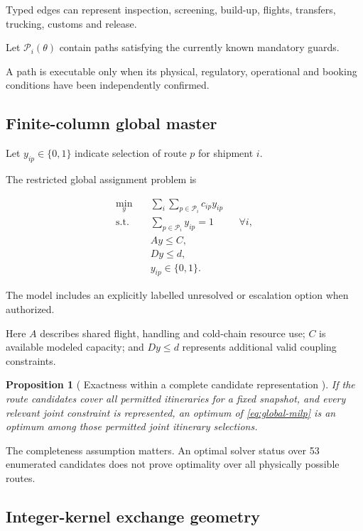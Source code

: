 \documentclass[10pt,a4paper]{article}
\theoremstyle{plain}
\newtheorem{proposition}[theorem]{Proposition}
\theoremstyle{definition}
\theoremstyle{remark}
\begin{document}
Typed edges can represent inspection,
screening, build-up, flights,
transfers, trucking, customs and release.

Let \(\mathcal P_i(\theta)\)
contain paths satisfying the
currently known mandatory guards.

A path is executable only when its
physical, regulatory,
operational and booking conditions
have been independently confirmed.

\subsection{Finite-column global master}

Let \(y_{ip}\in\{0,1\}\)
indicate selection of route \(p\)
for shipment \(i\).

The restricted global assignment problem is

\begin{equation}
\begin{aligned}
\min_y\quad
& \sum_i\sum_{p\in\mathcal P_i}c_{ip}y_{ip}\\
\text{s.t.}\quad
& \sum_{p\in\mathcal P_i}y_{ip}=1
&&\forall i,\\
& Ay\leq C,\\
& Dy\leq d,\\
& y_{ip}\in\{0,1\}.
\end{aligned}
\label{eq:global-milp}
\end{equation}

The model includes an explicitly
labelled unresolved or escalation
option when authorized.

Here \(A\) describes shared flight,
handling and cold-chain resource use;
\(C\) is available modeled capacity;
and \(Dy\leq d\) represents
additional valid coupling constraints.

\begin{proposition}[
Exactness within a complete
candidate representation
\cite{relaymodel3}
]
If the route candidates cover all
permitted itineraries for a fixed
snapshot, and every relevant joint
constraint is represented,
an optimum of
\eqref{eq:global-milp}
is an optimum among those
permitted joint itinerary selections.
\end{proposition}

The completeness assumption matters.
An optimal solver status over
53 enumerated candidates
does not prove optimality over
all physically possible routes.

\subsection{Integer-kernel exchange geometry}
\end{document}
